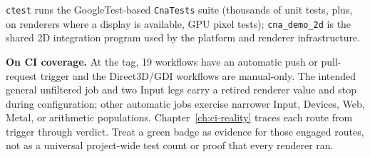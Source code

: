 \texttt{ctest} runs the GoogleTest-based \texttt{CnaTests} suite (thousands of unit tests,
plus, on renderers where a display is available, GPU pixel tests); \texttt{cna\_demo\_2d} is the
shared 2D integration program used by the platform and renderer infrastructure.

\begin{sourcenote}
\textbf{On CI coverage.} At the tag, 19 workflows have an automatic push or pull-request
trigger and the Direct3D/GDI workflows are manual-only.  The intended general unfiltered job and two Input legs carry
a retired renderer value and stop during configuration; other automatic jobs exercise narrower
Input, Devices, Web, Metal, or arithmetic populations.  Chapter~\ref{ch:ci-reality} traces each
route from trigger through verdict.  Treat a green badge as evidence for those engaged routes,
not as a universal project-wide test count or proof that every renderer ran.
\end{sourcenote}
